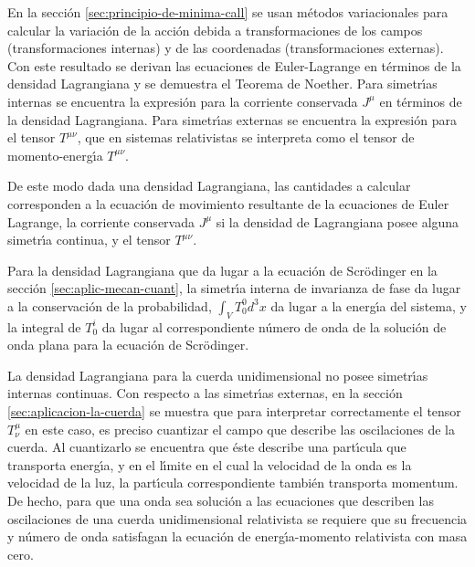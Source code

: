 En la secci\'on \ref{sec:principio-de-minima-call} se usan m\'etodos variacionales para calcular la variaci\'on de la acci\'on debida a transformaciones de los campos (transformaciones internas) y de las coordenadas (transformaciones externas). Con este resultado se derivan las ecuaciones de Euler-Lagrange en t\'erminos de la densidad Lagrangiana y se demuestra el  Teorema de Noether. Para simetr\'\i as internas se encuentra la expresi\'on para la corriente conservada $J^\mu$ en t\'erminos de la densidad Lagrangiana. Para simetr\'\i as externas se encuentra la expresi\'on para el tensor $T^{\mu\nu}$, que en sistemas relativistas se interpreta como el tensor de momento-energ\'\i a $T^{\mu\nu}$. 

De este modo dada una densidad Lagrangiana, las cantidades a calcular corresponden a la ecuaci\'on de movimiento resultante de la ecuaciones de Euler Lagrange, la corriente conservada $J^\mu$ si la densidad de Lagrangiana posee alguna simetr\'\i a continua, y el tensor $T^{\mu\nu}$. 

Para la densidad Lagrangiana que da lugar a la ecuaci\'on de Scr\"odinger en la secci\'on \ref{sec:aplic-mecan-cuant}, la simetr\'\i a interna de invarianza de fase da lugar a la conservaci\'on de la probabilidad, $\int_V T^0_0 d^3x$ da lugar a la energ\'\i a del sistema, y la integral de $T^i_0$ da lugar al correspondiente n\'umero de onda de la soluci\'on de onda plana para la ecuaci\'on de Scr\"odinger.

La densidad Lagrangiana para la cuerda unidimensional no posee simetr\'\i as internas continuas. Con respecto a las simetr\'\i as externas, en la secci\'on \ref{sec:aplicacion-la-cuerda} se muestra que para interpretar correctamente el tensor $T^\mu_\nu$ en este caso, es preciso cuantizar el campo que describe las oscilaciones de la cuerda. Al cuantizarlo se encuentra que \'este describe una part\'\i cula que transporta energ\'\i a, y en el l\'\i mite en el cual la velocidad de la onda es la velocidad de la luz, la part\'\i cula correspondiente tambi\'en transporta momentum. De hecho, para que una onda sea soluci\'on a las ecuaciones que describen las oscilaciones de una cuerda unidimensional relativista se requiere que su frecuencia y n\'umero de onda satisfagan la ecuaci\'on de energ\'\i a-momento relativista con masa cero.


